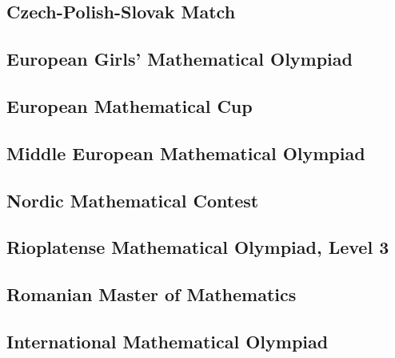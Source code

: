 \documentclass[../the-book.tex]{subfiles}
\begin{document}
\subsection*{Czech-Polish-Slovak Match}



\subsection*{European Girls' Mathematical Olympiad}



\subsection*{European Mathematical Cup}




\subsection*{Middle European Mathematical Olympiad}





\subsection*{Nordic Mathematical Contest}



\subsection*{Rioplatense Mathematical Olympiad, Level 3}



\subsection*{Romanian Master of Mathematics}




\subsection*{International Mathematical Olympiad}









\end{document}
